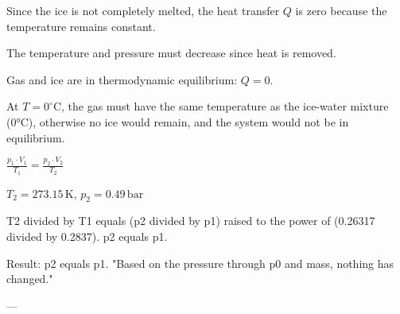 Since the ice is not completely melted, the heat transfer \( Q \) is zero because the temperature remains constant.  

The temperature and pressure must decrease since heat is removed.  

Gas and ice are in thermodynamic equilibrium: \( Q = 0 \).  

At \( T = 0^\circ \text{C} \), the gas must have the same temperature as the ice-water mixture (0°C), otherwise no ice would remain, and the system would not be in equilibrium.  

\( \frac{p_1 \cdot V_1}{T_1} = \frac{p_2 \cdot V_2}{T_2} \)  

\( T_2 = 273.15 \, \text{K} \), \( p_2 = 0.49 \, \text{bar} \)

T2 divided by T1 equals (p2 divided by p1) raised to the power of (0.26317 divided by 0.2837).  
p2 equals p1.  

Result: p2 equals p1.  
"Based on the pressure through p0 and mass, nothing has changed."

---